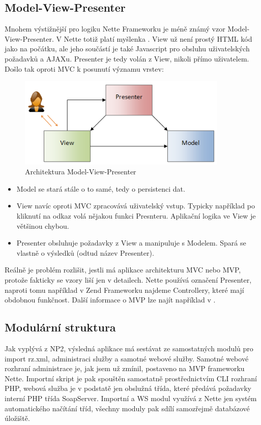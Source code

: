 \documentclass[11pt,twoside,a4paper]{book}
\begin{document}
\subsection{Model-View-Presenter}

Mnohem výstižnější pro logiku Nette Frameworku je méně známý vzor Model-View-Presenter. V Nette totiž platí myšlenka \cite{zdrojak:nette}. View už není prostý HTML kód jako na počátku, ale jeho součástí je také Javascript pro obsluhu uživatelských požadavků a AJAXu. Presenter je tedy volán z View, nikoli přímo uživatelem. Došlo tak oproti MVC k posunutí významu vrstev:
\begin{figure}[h]
\begin{center}
\includegraphics[width=10cm]{figures/mvp.png}
\caption{Architektura Model-View-Presenter}
\label{fig:mvp}
\end{center}
\end{figure}
\begin{itemize}
\item Model se stará stále o to samé, tedy o persistenci dat.
\item View navíc oproti MVC zpracovává uživatelský vstup. Typicky například po kliknutí na odkaz volá nějakou funkci Presnteru. Aplikační logika ve View je většinou chybou.
\item Presenter obsluhuje požadavky z View a manipuluje s Modelem. Spará se vlastně o  výsledků (odtud název Presenter).
\end{itemize}

Reálně je problém rozlišit, jestli má aplikace architekturu MVC nebo MVP, protože fakticky se vzory liší jen v detailech. Nette používá označení Presenter, naproti tomu například v Zend Frameworku najdeme Controllery, které mají obdobnou funkčnost. Další informace o MVP lze najít například v \cite{mvp}.

\subsection{Modulární struktura}
Jak vyplývá z NP2, výsledná aplikace má sestávat ze samostatných modulů pro import rz.xml, administraci služby a samotné webové služby. Samotné webové rozhraní administrace je, jak jsem už zmínil, postaveno na MVP frameworku Nette. Importní skript je pak spouštěn samostatně prostřednictvím CLI rozhraní PHP, webová služba je v podstatě jen obslužná třída, které předává požadavky interní PHP třída SoapServer. Importní a WS modul využívá z Nette jen systém automatického načítání tříd, všechny moduly pak sdílí samozřejmě databázové úložiště.
\end{document}
